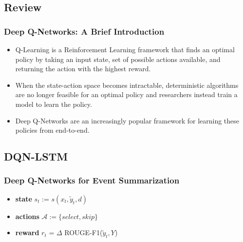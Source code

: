 \documentclass[]{beamer}
\begin{document}
	\subsection{Review}  
	\begin{frame}
			\frametitle{Deep Q-Networks: A Brief Introduction}
		\begin{itemize}
		\item <1 -> Q-Learning is a Reinforcement Learning framework that finds an optimal policy by taking an input state, set of possible actions available,  and returning the action with the highest reward.
		\item <1 -> When the state-action space becomes intractable, deterministic algorithms are no longer feasible for an optimal policy and researchers instead train a model to learn the policy. 
		\item <1 -> Deep Q-Networks \cite{MnihKSGAWR13} are an increasingly popular framework for learning these policies from end-to-end.
		\end{itemize}
	\end{frame}
	
	\subsection{DQN-LSTM}  
	\begin{frame}
			\frametitle{Deep Q-Networks for Event Summarization}

		\begin{itemize}
	\item<1 -> \textbf{state} $s_t$ := $s(x_{t},\tilde{y}_{t}, d)$ 
	\item<2 -> \textbf{actions} $\mathcal{A} := \{select, skip\}$
	\item<3 -> \textbf{reward} $r_t$ = $\Delta$ ROUGE-F1($\tilde{y}_{t}, Y$)
		\end{itemize}
	\end{frame}
\end{document}

